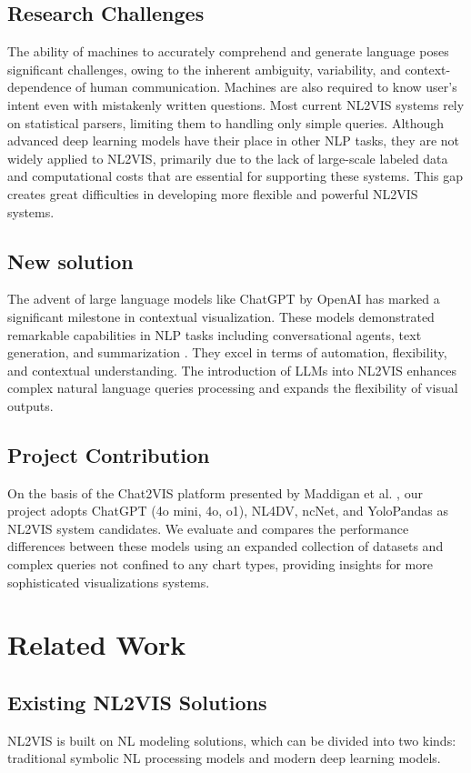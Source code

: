 \documentclass[conference]{IEEEtran}
\begin{document}
\subsection{Research Challenges}
The ability of machines to accurately comprehend and generate language poses significant challenges, owing to the inherent ambiguity, variability, and context-dependence of human communication. Machines are also required to know user's intent even with mistakenly written questions. 
Most current NL2VIS systems rely on statistical parsers, limiting them to handling only simple queries. Although advanced deep learning models have their place in other NLP tasks, they are not widely applied to NL2VIS, primarily due to the lack of large-scale labeled data \cite{luo2021nvbench} and computational costs that are essential for supporting these systems. This gap creates great difficulties in developing more flexible and powerful NL2VIS systems.

\subsection{New solution}
The advent of large language models like ChatGPT by OpenAI has marked a significant milestone in contextual visualization. These models demonstrated remarkable capabilities in NLP tasks including conversational agents, text generation, and summarization \cite{ray2023chatgpt}. They excel in terms of automation, flexibility, and contextual understanding. The introduction of LLMs into NL2VIS enhances complex natural language queries processing and expands the flexibility of visual outputs. 
\subsection{Project Contribution}
On the basis of the Chat2VIS platform presented by Maddigan et al. \cite{maddigan2023chat2vis}, our project adopts ChatGPT (4o mini, 4o, o1), NL4DV, ncNet, and YoloPandas as NL2VIS system candidates. We evaluate and compares the performance differences between these models using an expanded collection of datasets and complex queries not confined to any chart types, providing insights for more sophisticated visualizations systems.



\section{Related Work}
\subsection{Existing NL2VIS Solutions}
NL2VIS is built on NL modeling solutions, which can be divided into two kinds: traditional symbolic NL processing models and modern deep learning models.
\end{document}
